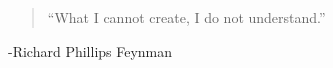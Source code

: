 
\chapter*{}

\begin{quote}
``What I cannot create, I do not understand.''

\end{quote}

\vspace{1in}
\hspace{2in}
-Richard Phillips Feynman 